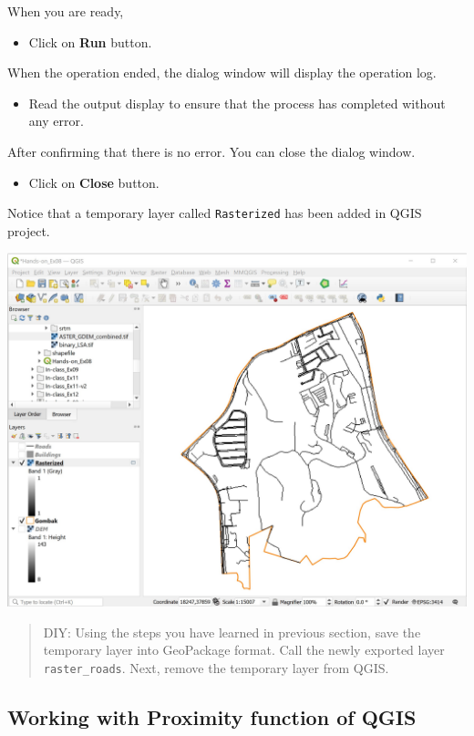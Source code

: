\documentclass[
  letterpaper,
  DIV=11,
  numbers=noendperiod]{scrreprt}
\providecommand{\tightlist}{%
  \setlength{\itemsep}{0pt}\setlength{\parskip}{0pt}}\usepackage{longtable,booktabs,array}
\begin{document}
When you are ready,

\begin{itemize}
\tightlist
\item
  Click on \textbf{Run} button.
\end{itemize}

When the operation ended, the dialog window will display the operation
log.

\begin{itemize}
\tightlist
\item
  Read the output display to ensure that the process has completed
  without any error.
\end{itemize}

After confirming that there is no error. You can close the dialog
window.

\begin{itemize}
\tightlist
\item
  Click on \textbf{Close} button.
\end{itemize}

Notice that a temporary layer called \texttt{Rasterized} has been added
in QGIS project.

\includegraphics{./img07/image25.jpg}

\begin{quote}
DIY: Using the steps you have learned in previous section, save the
temporary layer into GeoPackage format. Call the newly exported layer
\texttt{raster\_roads}. Next, remove the temporary layer from QGIS.
\end{quote}

\hypertarget{working-with-proximity-function-of-qgis}{%
\subsection{Working with Proximity function of
QGIS}\label{working-with-proximity-function-of-qgis}}
\end{document}
